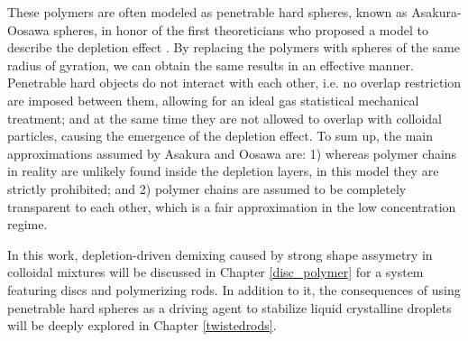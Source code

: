 These polymers are often modeled as penetrable hard spheres, known as Asakura-Oosawa spheres, in honor of the first theoreticians who proposed a model to describe the depletion effect \cite{ASAKURA54,ASAKURA58,Vrijdepletie}. By replacing the polymers with spheres of the same radius of gyration, we can obtain the same results in an effective manner. Penetrable hard objects do not interact with each other, i.e. no overlap restriction are imposed between them, allowing for an ideal gas statistical mechanical treatment; and at the same time they are not allowed to overlap with colloidal particles, causing the emergence of the depletion effect. To sum up, the main approximations assumed by Asakura and Oosawa are: 1) whereas polymer chains in reality are unlikely found inside the depletion layers, in this model they are strictly prohibited; and 2) polymer chains are assumed to be completely transparent to each other, which is a fair approximation in the low concentration regime.

In this work, depletion-driven demixing caused by strong shape assymetry in colloidal mixtures will be discussed in Chapter \ref{disc_polymer} for a system featuring discs and polymerizing rods. In addition to it, the consequences of using penetrable hard spheres as a driving agent to stabilize liquid crystalline droplets will be deeply explored in Chapter \ref{twistedrods}.


